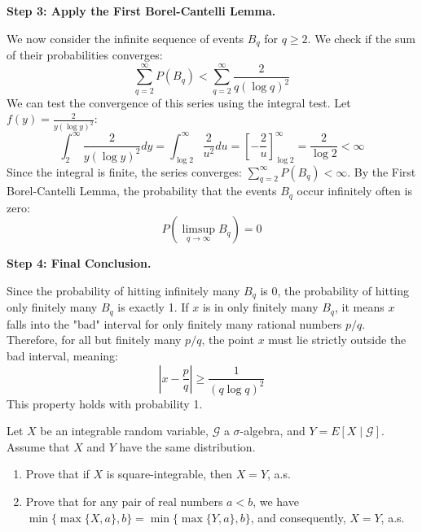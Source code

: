 \begin{solution}
\textbf{Step 3: Apply the First Borel-Cantelli Lemma.}

We now consider the infinite sequence of events $B_q$ for $q \geq 2$. We check if the sum of their probabilities converges:
\[ \sum_{q=2}^\infty P(B_q) < \sum_{q=2}^\infty \frac{2}{q (\log q)^2} \]
We can test the convergence of this series using the integral test. Let $f(y) = \frac{2}{y (\log y)^2}$:
\[ \int_2^\infty \frac{2}{y (\log y)^2} dy = \int_{\log 2}^\infty \frac{2}{u^2} du = \left[ -\frac{2}{u} \right]_{\log 2}^\infty = \frac{2}{\log 2} < \infty \]
Since the integral is finite, the series converges: $\sum_{q=2}^\infty P(B_q) < \infty$.
By the First Borel-Cantelli Lemma, the probability that the events $B_q$ occur infinitely often is zero:
\[ P(\limsup_{q \to \infty} B_q) = 0 \]

\textbf{Step 4: Final Conclusion.}

Since the probability of hitting infinitely many $B_q$ is 0, the probability of hitting only finitely many $B_q$ is exactly 1.
If $x$ is in only finitely many $B_q$, it means $x$ falls into the "bad" interval for only finitely many rational numbers $p/q$.
Therefore, for all but finitely many $p/q$, the point $x$ must lie strictly outside the bad interval, meaning:
\[ \left| x - \frac{p}{q} \right| \geq \frac{1}{(q \log q)^2} \]
This property holds with probability 1.
\end{solution}

\begin{exercise}
\label{probability:2013:9}
Let $X$ be an integrable random variable, $\mathcal{G}$ a $\sigma$-algebra, and $Y = E[X \mid \mathcal{G}]$. Assume that $X$ and $Y$ have the same distribution.
\begin{enumerate}
    \item Prove that if $X$ is square-integrable, then $X = Y$, a.s.
    \item Prove that for any pair of real numbers $a < b$, we have $\min\{\max\{X, a\}, b\} = \min\{\max\{Y, a\}, b\}$, and consequently, $X = Y$, a.s.
\end{enumerate}
\end{exercise}


